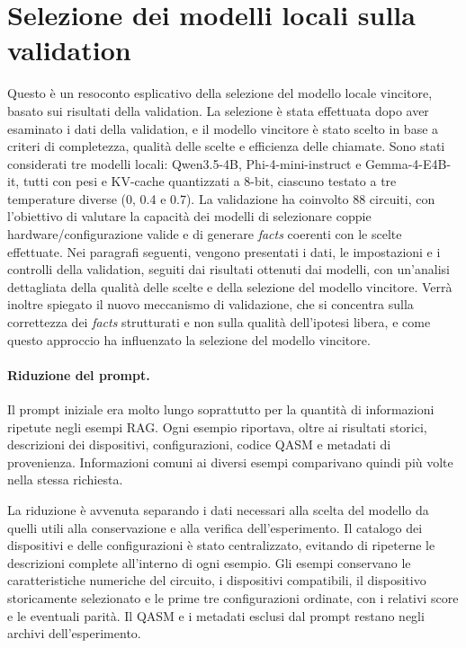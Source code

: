 \providecommand{\ValidationFiguresPath}{figures/}

\section{Selezione dei modelli locali sulla validation}

Questo è un resoconto esplicativo della selezione del modello locale vincitore, basato sui risultati della validation. La selezione è stata effettuata dopo aver esaminato i dati della validation, e il modello vincitore è stato scelto in base a criteri di completezza, qualità delle scelte e efficienza delle chiamate.
Sono stati considerati tre modelli locali: Qwen3.5-4B, Phi-4-mini-instruct e Gemma-4-E4B-it, tutti con pesi e KV-cache quantizzati a 8-bit, ciascuno testato a tre temperature diverse (0, 0.4 e 0.7). La validazione ha coinvolto 88 circuiti, con l'obiettivo di valutare la capacità dei modelli di selezionare coppie hardware/configurazione valide e di generare \textit{facts} coerenti con le scelte effettuate.
Nei paragrafi seguenti, vengono presentati i dati, le impostazioni e i controlli della validation, seguiti dai risultati ottenuti dai modelli, con un'analisi dettagliata della qualità delle scelte e della selezione del modello vincitore.
Verrà inoltre spiegato il nuovo meccanismo di validazione, che si concentra sulla correttezza dei \textit{facts} strutturati e non sulla qualità dell'ipotesi libera, e come questo approccio ha influenzato la selezione del modello vincitore.

\paragraph{Riduzione del prompt.}
Il prompt iniziale era molto lungo soprattutto per la quantità di
informazioni ripetute negli esempi RAG. Ogni esempio riportava,
oltre ai risultati storici, descrizioni dei dispositivi, configurazioni,
codice QASM e metadati di provenienza. Informazioni comuni ai diversi
esempi comparivano quindi più volte nella stessa richiesta.

La riduzione è avvenuta separando i dati necessari alla scelta del
modello da quelli utili alla conservazione e alla verifica
dell'esperimento. Il catalogo dei dispositivi e delle configurazioni
è stato centralizzato, evitando di ripeterne le descrizioni complete
all'interno di ogni esempio. Gli esempi conservano le caratteristiche
numeriche del circuito, i dispositivi compatibili, il dispositivo
storicamente selezionato e le prime tre configurazioni ordinate,
con i relativi score e le eventuali parità.
Il QASM e i metadati esclusi dal prompt restano negli archivi
dell'esperimento.

